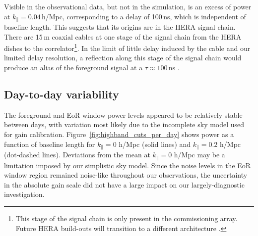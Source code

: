 \documentclass[twocolumn, trackchanges]{aastex61}
\begin{document}
Visible in the observational data, but not in the simulation, is an excess of power at $k_{\parallel}=0.04$\,h/Mpc, corresponding to a delay of 100\,ns, which is independent of baseline length. This suggests that its origins are in the HERA signal chain. There are 15\,m coaxial cables at one stage of the signal chain from the HERA dishes to the correlator\footnote{This stage of the signal chain is only present in the commissioning array. Future HERA build-outs will transition to a different architecture \citep{deBoer17}.}. In the limit of little delay induced by the cable and our limited delay resolution, a reflection along this stage of the signal chain would produce an alias of the foreground signal at a $\tau \approx 100$\,ns \citep{Beardsley.16, Ewall-Wice.EoX}.

\subsection{Day-to-day variability}
\label{subsec:variability}

The foreground and EoR window power levels appeared to be relatively stable between days, with variation most likely due to the incomplete sky model used for gain calibration. Figure~\ref{fig:highband_cuts_per_day} shows power as a function of baseline length for $k_{\parallel}=0$ h/Mpc (solid lines) and $k_{\parallel}=0.2$ h/Mpc (dot-dashed lines). Deviations from the mean at $k_{\parallel}=0$ h/Mpc may be a limitation imposed by our simplistic sky model. Since the noise levels in the EoR window region remained noise-like throughout our observations, the uncertainty in the absolute gain scale did not have a large impact on our largely-diagnostic investigation.
\end{document}
